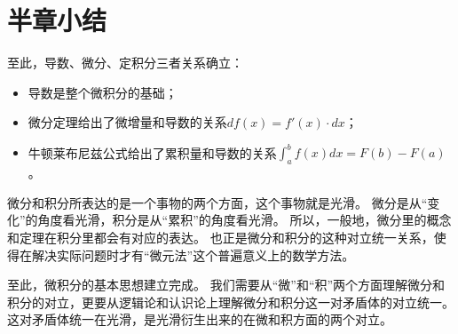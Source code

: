 \section{半章小结}

至此，导数、微分、定积分三者关系确立：
\begin{itemize}
    \item 导数是整个微积分的基础；
    \item 微分定理给出了微增量和导数的关系$df\left( x \right) =f'\left( x \right) \cdot dx$；
    \item 牛顿莱布尼兹公式给出了累积量和导数的关系$\int_a^b{f\left( x \right) dx}=F\left( b \right) -F\left( a \right)$。
\end{itemize}

微分和积分所表达的是一个事物的两个方面，这个事物就是光滑。
微分是从“变化”的角度看光滑，积分是从“累积”的角度看光滑。
所以，一般地，微分里的概念和定理在积分里都会有对应的表达。
也正是微分和积分的这种对立统一关系，使得在解决实际问题时才有“微元法”这个普遍意义上的数学方法。

至此，微积分的基本思想建立完成。
我们需要从“微”和“积”两个方面理解微分和积分的对立，更要从逻辑论和认识论上理解微分和积分这一对矛盾体的对立统一。
这对矛盾体统一在光滑，是光滑衍生出来的在微和积方面的两个对立。





